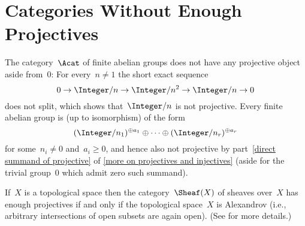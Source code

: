 \section{Categories Without Enough Projectives}


\begin{example}
  The category~$\Acat$ of finite abelian groups does not have any projective object aside from~$0$:
  For every~$n \neq 1$ the short exact sequence
  \[
    0
    \to
    \Integer/n
    \to
    \Integer/n^2
    \to
    \Integer/n
    \to
    0
  \]
  does not split, which shows that~$\Integer/n$ is not projective.
  Every finite abelian group is (up to isomorphism) of the form
  \[
      (\Integer/n_1)^{\oplus a_1}
      \oplus
      \dotsb
      \oplus
      (\Integer/n_r)^{\oplus a_r}
  \]
  for some~$n_i \neq 0$ and~$a_i \geq 0$, and hence also not projective by part~\ref*{direct summand of projective} of \cref{more on projectives and injectives} (aside for the trivial group~$0$ which admit zero such summand).
\end{example}





\begin{example}
  If~$X$ is a topological space then the category~$\Sheaf(X)$ of sheaves over~$X$ has enough projectives if and only if the topological space~$X$ is Alexandrov (i.e., arbitrary intersections of open subsets are again open).
  (See \cite{shXenoughprojectives} for more details.)
\end{example}




